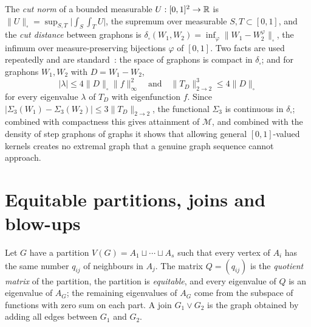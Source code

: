 The \emph{cut norm} of a bounded measurable $U:[0,1]^2\to\mathbb R$ is
$\|U\|_\square=\sup_{S,T}\bigl|\int_S\int_TU\bigr|$, the supremum over
measurable $S,T\subset[0,1]$, and the \emph{cut distance} between graphons is
$\delta_\square(W_1,W_2)=\inf_\varphi\|W_1-W_2^\varphi\|_\square$, the infimum
over measure-preserving bijections $\varphi$ of $[0,1]$. Two facts are used
repeatedly and are standard~\cite{LovaszBook,BCLSV,LS}: the space of graphons
is compact in $\delta_\square$; and for graphons $W_1,W_2$ with $D=W_1-W_2$,
\begin{equation}\label{cut-eigen}
 |\lambda|\le4\|D\|_\square\|f\|_\infty^2
 \quad\text{and}\quad
 \|T_D\|_{2\to2}^3\le4\|D\|_\square
\end{equation}
for every eigenvalue $\lambda$ of $T_D$ with eigenfunction $f$. Since
$|\Sigma_3(W_1)-\Sigma_3(W_2)|\le3\|T_D\|_{2\to2}$, the functional $\Sigma_3$
is continuous in $\delta_\square$; combined with compactness this gives
attainment of $\mathcal M$, and combined with the density of step graphons of
graphs it shows that allowing general $[0,1]$-valued kernels creates no
extremal graph that a genuine graph sequence cannot approach.

\section{Equitable partitions, joins and blow-ups}\label{sec-equitable}
Let $G$ have a partition $V(G)=A_1\sqcup\cdots\sqcup A_s$ such that every
vertex of $A_i$ has the same number $q_{ij}$ of neighbours in $A_j$. The
matrix $Q=(q_{ij})$ is the \emph{quotient matrix} of the partition, the
partition is \emph{equitable}, and every eigenvalue of $Q$ is an eigenvalue of
$A_G$; the remaining eigenvalues of $A_G$ come from the subspace of functions
with zero sum on each part. A join $G_1\vee G_2$ is the graph obtained by
adding all edges between $G_1$ and $G_2$.


